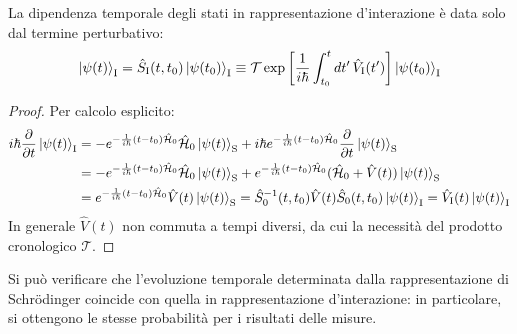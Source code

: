 \begin{proposition}
	La dipendenza temporale degli stati in rappresentazione d'interazione è data solo dal termine perturbativo:
	\begin{equation}
		\ket{\psi(t)}_{\text{I}} = \hat{S}_{\text{I}}(t,t_0) \ket{\psi(t_0)}_{\text{I}} \equiv \mathcal{T} \exp \left[ \frac{1}{i\hbar} \int_{t_0}^t dt'\, \hat{V}_{\text{I}}(t') \right] \ket{\psi(t_0)}_{\text{I}}
		\label{eq:5.18}
	\end{equation}
\end{proposition}
\begin{proof}
	Per calcolo esplicito:
	\begin{equation*}
		\begin{split}
			i\hbar \frac{\partial}{\partial t} \ket{\psi(t)}_{\text{I}}
			&= - e^{-\frac{1}{i\hbar} (t - t_0) \hat{\mathcal{H}}_0} \hat{\mathcal{H}}_0 \ket{\psi(t)}_{\text{S}} + i\hbar e^{-\frac{1}{i\hbar} (t - t_0) \hat{\mathcal{H}}_0} \frac{\partial}{\partial t} \ket{\psi(t)}_{\text{S}} \\
			&= - e^{-\frac{1}{i\hbar} (t - t_0) \hat{\mathcal{H}}_0} \hat{\mathcal{H}}_0 \ket{\psi(t)}_{\text{S}} + e^{-\frac{1}{i\hbar} (t - t_0) \hat{\mathcal{H}}_0} ( \hat{\mathcal{H}}_0 + \hat{V}(t) ) \ket{\psi(t)}_{\text{S}} \\
			&= e^{-\frac{1}{i\hbar} (t - t_0) \hat{\mathcal{H}}_0} \hat{V}(t) \ket{\psi(t)}_{\text{S}} = \hat{S}_0^{-1}(t,t_0) \hat{V}(t) \hat{S}_0(t,t_0) \ket{\psi(t)}_{\text{I}} = \hat{V}_{\text{I}}(t) \ket{\psi(t)}_{\text{I}}
		\end{split}
	\end{equation*}
	In generale $ \hat{V}(t) $ non commuta a tempi diversi, da cui la necessità del prodotto cronologico $ \mathcal{T} $.
\end{proof}

Si può verificare che l'evoluzione temporale determinata dalla rappresentazione di Schrödinger coincide con quella in rappresentazione d'interazione: in particolare, si ottengono le stesse probabilità per i risultati delle misure.

